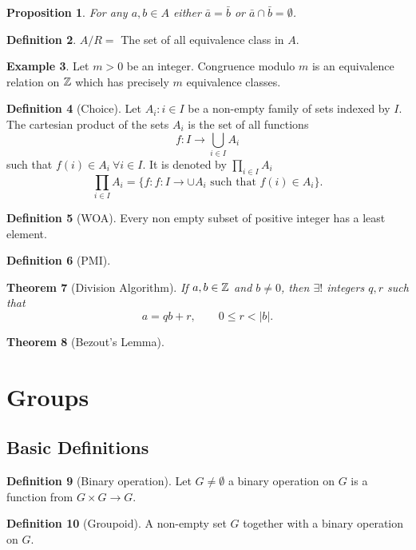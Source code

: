 \documentclass[leqno,DIV=calc,paper=a4,fontsize=11pt]{article}
\newtheorem{thm}{Theorem}[section]
\newtheorem{prop}[thm]{Proposition}
\theoremstyle{definition}
\newtheorem{defn}[thm]{Definition}
\newtheorem{exmp}[thm]{Example}
\theoremstyle{plain}
\theoremstyle{remark}
\begin{document}
\begin{prop}
For any $a,b\in A$ either $\bar{a}=\bar{b}$ or $\bar{a}\cap\bar{b}=\emptyset$.
\end{prop}
\begin{defn}
$A/R=$ The set of all equivalence class in $A$.
\end{defn}
\begin{exmp}
Let $m>0$ be an integer. Congruence modulo $m$ is an equivalence relation on $\Bbb Z$ which has precisely $m$ equivalence classes.
\end{exmp}

\begin{defn}[Choice]
Let $A_i:i\in I$ be a non-empty family of sets indexed by $I$. The cartesian product of the sets $A_i$ is the set of all functions
$$f:I\to \bigcup_{i\in I}A_i$$
such that $f(i)\in A_i\ \forall i\in I$. It is denoted by $\prod_{i\in I}A_i$
$$\prod_{i\in I}A_i=\{f:f:I\to \cup A_i\text{ such that }f(i)\in A_i\}.$$
\end{defn}
\begin{defn}[WOA]
Every non empty subset of positive integer has a least element.
\end{defn}
\begin{defn}[PMI]

\end{defn}
\begin{thm}[Division Algorithm]
If $a,b\in \Bbb Z$ and $b\neq 0$, then $\exists!$ integers $q,r$ such that
$$a=qb+r,\qquad 0\leq r<|b|.$$
\end{thm}

\begin{thm}[Bezout's Lemma]

\end{thm}

\newpage
\section{Groups}
\subsection{Basic Definitions}
\begin{defn}[Binary operation]
Let $G\neq \emptyset$ a binary operation on $G$ is a function from $G\times G\to G$.
\end{defn}

\begin{defn}[Groupoid]
A non-empty set $G$ together with a binary operation on $G$.
\end{defn}
\end{document}
